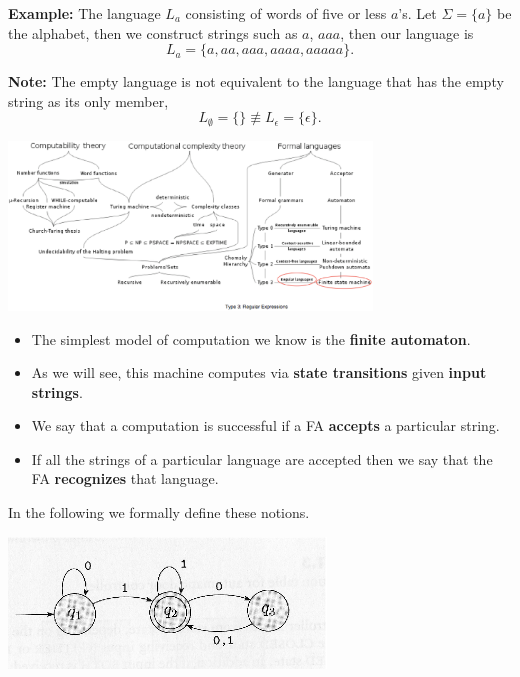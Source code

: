 \documentclass[a4paper,blends,pdf,colorBG,slideColor]{prosper}
\begin{document}
{\bf Example:} The language $L_a$ consisting of words of five or less $a$'s.  
Let $\Sigma = \{a\}$ be the alphabet, then we construct strings such as $a$, $aaa$,
then our language is
\[
L_a = \{ a, aa, aaa, aaaa, aaaaa\}.
\]

{\bf Note:} The empty language is not equivalent to the language that has the
empty string as its only member,
\[
L_\emptyset = \{ \} \not\equiv L_\epsilon = \{ \epsilon \}.
\]
\es

\begin{center}
    \includegraphics[height=45mm]{images/course-road-map-02.eps}
\end{center}

\es

\begin{itemize}
\item The simplest model of computation we know is the {\bf finite automaton}.
\item As we will see, this machine computes via {\bf state transitions} given {\bf input strings}.
\item We say that a computation is successful if a FA {\bf accepts} a particular string.
\item If all the strings of a particular language are accepted then we say that the FA {\bf recognizes} that language.
\end{itemize}

In the following we formally define these notions. 

\es

\begin{center}
    \includegraphics[height=35mm]{images/FA-01.eps}
\end{center}
\end{document}
